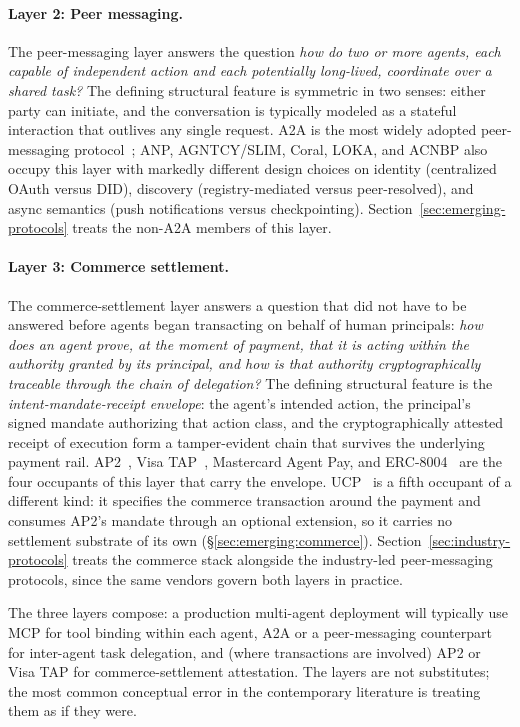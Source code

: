 \paragraph{Layer 2: Peer messaging.}
The peer-messaging layer answers the question \emph{how do
two or more agents, each capable of independent action and
each potentially long-lived, coordinate over a shared task?}
The defining structural feature is symmetric in two senses:
either party can initiate, and the conversation is
typically modeled as a stateful interaction that outlives
any single request. A2A is the most widely adopted peer-messaging
protocol~\cite{spec_a2a}; ANP, AGNTCY/SLIM, Coral, LOKA, and
ACNBP also occupy this layer with markedly different design
choices on identity (centralized OAuth versus DID), discovery
(registry-mediated versus peer-resolved), and async semantics
(push notifications versus checkpointing). Section~\ref{sec:emerging-protocols}
treats the non-A2A members of this layer.

\paragraph{Layer 3: Commerce settlement.}
The commerce-settlement layer answers a question that did
not have to be answered before agents began transacting on
behalf of human principals: \emph{how does an agent prove,
at the moment of payment, that it is acting within the
authority granted by its principal, and how is that
authority cryptographically traceable through the chain of
delegation?} The defining structural feature is the
\emph{intent-mandate-receipt envelope}: the agent's intended
action, the principal's signed mandate authorizing that
action class, and the cryptographically attested receipt
of execution form a tamper-evident chain that survives the
underlying payment rail. AP2~\cite{spec_ap2}, Visa
TAP~\cite{spec_visa_tap}, Mastercard Agent Pay, and
ERC-8004~\cite{spec_erc8004} are the four occupants of this
layer that carry the envelope. UCP~\cite{spec_ucp} is a fifth
occupant of a different kind: it specifies the commerce
transaction around the payment and consumes AP2's mandate
through an optional extension, so it carries no settlement
substrate of its own (\S\ref{sec:emerging:commerce}).
Section~\ref{sec:industry-protocols}
treats the commerce stack alongside the industry-led
peer-messaging protocols, since the same vendors govern
both layers in practice.

The three layers compose: a production multi-agent deployment
will typically use MCP for tool binding within each agent, A2A
or a peer-messaging counterpart for inter-agent task
delegation, and (where transactions are involved) AP2 or Visa
TAP for commerce-settlement attestation. The layers are not
substitutes; the most common conceptual error in the
contemporary literature is treating them as if they were.

